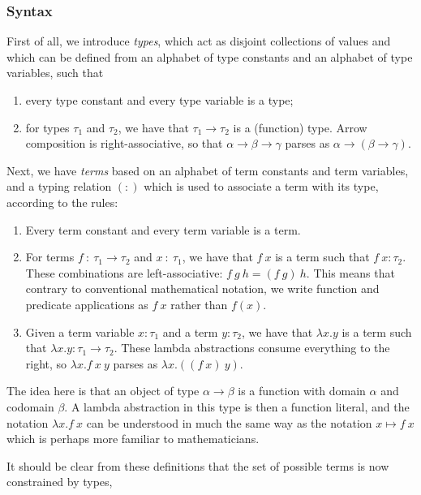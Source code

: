 \subsubsection{Syntax}
First of all, we introduce \emph{types}, which act as disjoint collections of values and which can be defined from an alphabet of type constants and an alphabet of type variables, such that
\begin{enumerate}
\item every type constant and every type variable is a type;
\item for types $\tau_1$ and $\tau_2$, we have that $\tau_1 \rightarrow \tau_2$ is a (function) type. Arrow composition is right-associative, so that $\alpha \rightarrow \beta \rightarrow \gamma$ parses as $\alpha \rightarrow (\beta \rightarrow \gamma)$.
\end{enumerate}

Next, we have \emph{terms} based on an alphabet of term constants and term variables, and a typing relation $(:)$ which is used to associate a term with its type, according to the rules:
\begin{enumerate}
\item Every term constant and every term variable is a term.
\item For terms $f\ :\ \tau_1\rightarrow\tau_2$ and $x\ :\ \tau_1$, we have that $f\ x$ is a term such that \mbox{$f\ x : \tau_2$}. These combinations are left-associative: $f\ g\ h = (f\ g)\ h$. This means that contrary to conventional mathematical notation, we write function and predicate applications as $f\ x$ rather than $f(x)$.
\item Given a term variable $x : \tau_1$ and a term $y : \tau_2$, we have that $\lambda x. y$ is a term such that $\lambda x. y : \tau_1 \rightarrow \tau_2$. These lambda abstractions consume everything to the right, so $\lambda x. f\ x\ y$ parses as $\lambda x. ((f\ x)\ y)$.
\end{enumerate}

The idea here is that an object of type $\alpha \rightarrow \beta$ is a function with domain $\alpha$ and codomain $\beta$. A lambda abstraction in this type is then a function literal, and the notation $\lambda x. f\ x$ can be understood in much the same way as the notation $x \mapsto f\ x$ which is perhaps more familiar to mathematicians.

It should be clear from these definitions that the set of possible terms is now constrained by types, 

